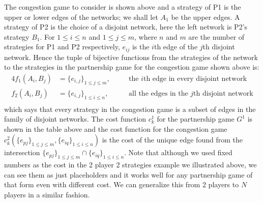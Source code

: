 \documentclass[a4paper,12pt]{article}
\theoremstyle{definition}
\begin{document}
\begin{enumerate}
\begin{enumerate}[(a)]
The congestion game to consider is shown above and a strategy of P1 is the upper or lower edges of the networks; we shall let $A_1$ be the upper edges. A strategy of P2  is the choice of a disjoint network, here the left network is P2's strategy $B_1$. For  $1\leq i \leq n$ and  $1\leq j \leq m$, where $n$ and $m$ are the number of strategies for P1 and P2 respectively, $e_{ij}$ is the $i$th edge of the $j$th disjoint network.
Hence the tuple of bijective functions from the strategies of the network to the strategies in the partnership game for the congestion game shown above is:
\begin{alignat*}{4}
f_1(A_i,B_j)&=\{e_{i,j}\}_{1\leq j\leq m}, &\quad&\text{the $i$th edge in every disjoint network }\\
f_2(A_i,B_j)&=\{e_{i,j}\}_{1\leq i\leq n}, &\quad &\text{all the edges in the $j$th disjoint network}\\
\end{alignat*}
which says that every strategy in the congestion game is a subset of edges in the family of disjoint networks. The cost function $c^1_k$ for the partnership game $G^1$ is shown in the table above and the cost function for the congestion game $c_k^2(\{e_{pj}\}_{1\leq j \leq m},\{e_{iq}\}_{1\leq i \leq n})$ is the cost of the unique edge found from the intersection $\{e_{pj}\}_{1\leq j \leq m}\cap\{e_{iq}\}_{1\leq i \leq n}$. Note that although we used fixed numbers as the cost in the 2 player 2 strategies example we illustrated above, we can see them as just placeholders and it works well for any partnership game of that form even with different cost. We can generalize this from 2 players to $N$ players in a similar fashion.

 
%
%


\end{enumerate}
\end{enumerate}
\end{document}
